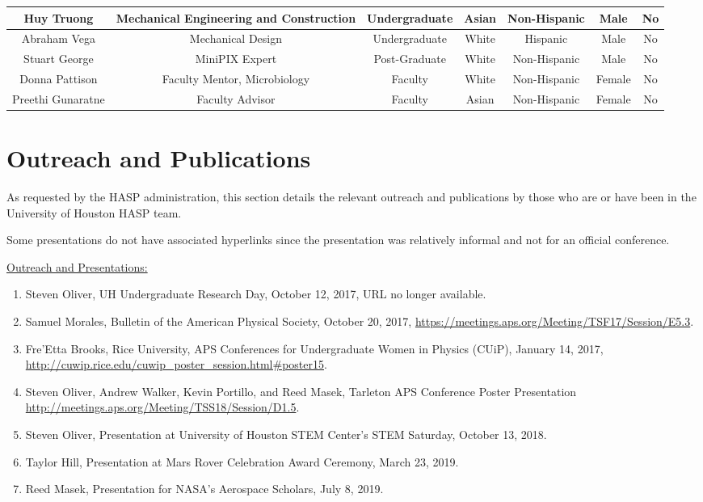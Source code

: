 \begin{appendices}
\begin{table}[h!]
\begin{tabular}  {ccccccc}
      Huy Truong & Mechanical Engineering and Construction & Undergraduate & Asian & Non-Hispanic & Male & No \\ \hline
      Abraham Vega & Mechanical Design & Undergraduate & White & Hispanic & Male & No \\ \hline
	  Stuart George & MiniPIX Expert & Post-Graduate & White & Non-Hispanic & Male & No \\ \hline
	  Donna Pattison & Faculty Mentor, Microbiology & Faculty & White & Non-Hispanic & Female & No \\ \hline
	  Preethi Gunaratne & Faculty Advisor & Faculty & Asian & Non-Hispanic & Female & No \\ \hline
	\end{tabular}
  \end{table}

  \section{Outreach and Publications}
  \noindent As requested by the HASP administration, this section details the relevant outreach and publications by those who are or have been in the University of Houston HASP team.

  \noindent Some presentations do not have associated hyperlinks since the presentation was relatively informal and not for an official conference. 

  \vspace{0.25cm}
  \noindent\underline{Outreach and Presentations:}
  \begin{enumerate}[leftmargin=3\parindent]
    \item Steven Oliver, UH Undergraduate Research Day, October 12, 2017, URL no longer available.
  \item Samuel Morales, Bulletin of the American Physical Society, October 20, 2017, \url{https://meetings.aps.org/Meeting/TSF17/Session/E5.3}.
  \item Fre'Etta Brooks, Rice University, APS Conferences for Undergraduate Women in Physics (CUiP), January 14, 2017, \url{http://cuwip.rice.edu/cuwip_poster_session.html#poster15}.
  \item Steven Oliver, Andrew Walker, Kevin Portillo, and Reed Masek, Tarleton APS Conference Poster Presentation \url{http://meetings.aps.org/Meeting/TSS18/Session/D1.5}.
  \item Steven Oliver, Presentation at University of Houston STEM Center's STEM Saturday, October 13, 2018.
  \item Taylor Hill, Presentation at Mars Rover Celebration Award Ceremony, March 23, 2019.
  \item Reed Masek, Presentation for NASA's Aerospace Scholars, July 8, 2019.
  \end{enumerate}


\end{appendices}
